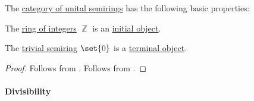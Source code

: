 \begin{proposition}\label{thm:category_of_semirings_properties}
  The \hyperref[def:semiring/category]{category of unital semirings} has the following basic properties:
  \begin{thmenum}
     The \hyperref[def:integers]{ring of integers} \( \BbbZ \) is an \hyperref[def:universal_objects/initial]{initial object}.

     The \hyperref[def:semiring/trivial]{trivial semiring} \( \set{ 0 } \) is a \hyperref[def:universal_objects/terminal]{terminal object}.
  \end{thmenum}
\end{proposition}
\begin{proof}
   Follows from .
   Follows from .
\end{proof}

\paragraph{Divisibility}

